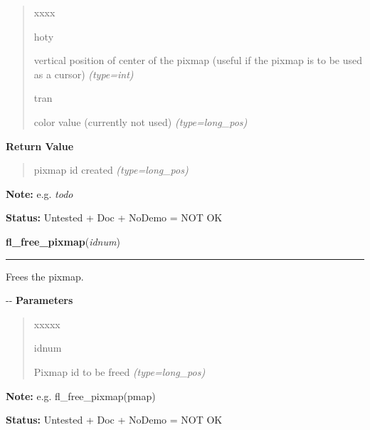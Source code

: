 \begin{boxedminipage}{\funcwidth}
\begin{quote}
\begin{Ventry}{xxxx}
          \item[hoty]


vertical position of center of the pixmap (useful if the pixmap is
to be used as a cursor)
            {\it (type=int)}

          \item[tran]


color value (currently not used)
            {\it (type=long\_pos)}

        \end{Ventry}

      \end{quote}

      \textbf{Return Value}
    \vspace{-1ex}

      \begin{quote}

pixmap id created
      {\it (type=long\_pos)}

      \end{quote}

\textbf{Note:} 
e.g. \emph{todo}


\textbf{Status:} 
Untested + Doc + NoDemo = NOT OK


    \end{boxedminipage}

    \label{xformslib:flbitmap:fl_free_pixmap}

    \vspace{0.5ex}

\hspace{.8\funcindent}\begin{boxedminipage}{\funcwidth}

    \raggedright \textbf{fl\_free\_pixmap}(\textit{idnum})

    \vspace{-1.5ex}

    \rule{\textwidth}{0.5\fboxrule}
\setlength{\parskip}{2ex}

Frees the pixmap.

-{}-
\setlength{\parskip}{1ex}
      \textbf{Parameters}
      \vspace{-1ex}

      \begin{quote}
        \begin{Ventry}{xxxxx}

          \item[idnum]


Pixmap id to be freed
            {\it (type=long\_pos)}

        \end{Ventry}

      \end{quote}

\textbf{Note:} 
e.g. fl\_free\_pixmap(pmap)


\textbf{Status:} 
Untested + Doc + NoDemo = NOT OK


    \end{boxedminipage}

